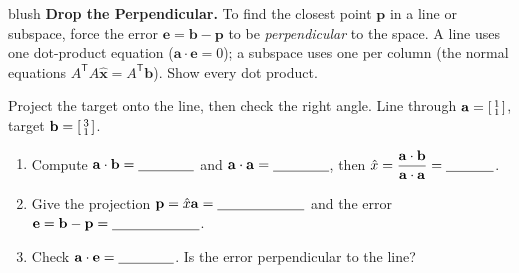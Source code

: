 \documentclass[10pt]{article}
\newcommand{\xx}{\mathbf{x}}
\newcommand{\bb}{\mathbf{b}}
\newcommand{\pp}{\mathbf{p}}
\newcommand{\ee}{\mathbf{e}}
\newcommand{\avec}{\mathbf{a}}
\newcommand{\T}{\mathsf{T}}
\begin{document}
\namepartnerperiod

\vspace{0.10in}

\begin{headlinebox}{blush}
\small\textbf{Drop the Perpendicular.} To find the closest point $\pp$ in a line or subspace, force the
error $\ee=\bb-\pp$ to be \emph{perpendicular} to the space. A line uses one dot-product equation
($\avec\cdot\ee=0$); a subspace uses one per column (the normal equations $A^{\T}A\hat{\xx}=A^{\T}\bb$).
Show every dot product.
\end{headlinebox}

\vspace{0.08in}

\begin{tcolorbox}[colback=white, colframe=black!40, title=\textbf{Tier R --- Remediate},
    fonttitle=\bfseries, arc=1.5mm, left=3mm, right=3mm, top=2mm, bottom=2mm, breakable]
Project the target onto the line, then check the right angle.
Line through $\avec=\begin{bsmallmatrix} 1\\1 \end{bsmallmatrix}$, target $\bb=\begin{bsmallmatrix} 3\\1 \end{bsmallmatrix}$.
\begin{enumerate}[leftmargin=1.7em, itemsep=7pt]
  \item Compute $\avec\cdot\bb=\blank{1.4cm}$ and $\avec\cdot\avec=\blank{1.4cm}$, then
        $\hat{x}=\dfrac{\avec\cdot\bb}{\avec\cdot\avec}=\blank{1.2cm}$.
  \item Give the projection $\pp=\hat{x}\avec=\blank{2.2cm}$ and the error $\ee=\bb-\pp=\blank{2.2cm}$.
  \item Check $\avec\cdot\ee=\blank{1.4cm}$. Is the error perpendicular to the line? \blank{1.8cm}
\end{enumerate}
\end{tcolorbox}
\end{document}
